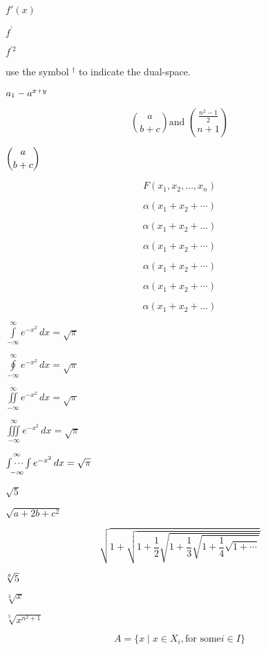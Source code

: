 \documentclass{article}
\begin{document}
$f'(x)$

$f^{\prime}$

$f^{\prime 2}$


use the symbol ${}^{\dagger}$ to indicate the dual-space. 



$a\sb{1} -a\sp{x+y}$



\[
	\binom{a}{b+c} \text{and }
	\binom{\frac{n^{2} -1}{2}}{n+1}
\]

$\dbinom{a}{b+c}$




\[
	F(x_{1}, x_{2}, \dots, x_{n})
\]


\[
	\alpha(x_{1} + x_{2} + \cdots)
\]


\[
\alpha(x_{1} + x_{2} + \dotsc)
\]


\[
\alpha(x_{1} + x_{2} + \dotsb)
\]

\[
\alpha(x_{1} + x_{2} + \dotsm)
\]


\[
\alpha(x_{1} + x_{2} + \dotsi)
\]


\[
\alpha(x_{1} + x_{2} + \dotso)
\]




$\int\limits_{-\infty} ^ {\infty} e^{-x^{2}} \, dx = \sqrt{\pi}$


$\oint\limits_{-\infty} ^ {\infty} e^{-x^{2}} \, dx = \sqrt{\pi}$


$\iint\limits_{-\infty} ^ {\infty} e^{-x^{2}} \, dx = \sqrt{\pi}$

$\iiint\limits_{-\infty} ^ {\infty} e^{-x^{2}} \, dx = \sqrt{\pi}$

$\idotsint\limits_{-\infty} ^ {\infty} e^{-x^{2}} \, dx = \sqrt{\pi}$




$\sqrt{5}$

$\sqrt{a+2b+c^{2}}$


\[
	\sqrt{1+ \sqrt{1+ \frac{1}{2}\sqrt{1+ \frac{1}{3}
	\sqrt{1+ \frac{1}{4}\sqrt{1+\cdots}}}}}
\]



$ \sqrt[\leftroot{2} \uproot{2} g]{5}$


$\sqrt[3]{x}$

$\sqrt[5]{x^{n^{2}+1}}$




\[
 A = \{ x \mid x \in X_{i}, \text{for some}
  i \in I \}
\]
\end{document}

